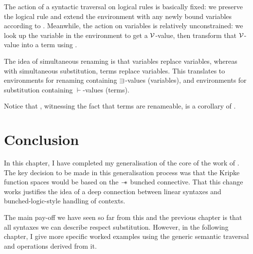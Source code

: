 The action of a syntactic traversal on logical rules is basically fixed: we
preserve the logical rule and extend the environment with any newly bound
variables according to .
Meanwhile, the action on variables is relatively unconstrained: we look up the
variable in the environment to get a $\mathcal V$-value, then transform that $\mathcal V$-value
into a term using .

The idea of simultaneous renaming is that variables replace variables, whereas
with simultaneous substitution, terms replace variables.
This translates to environments for renaming containing $\sqni$-values
(variables), and environments for substitution containing $\vdash$-values
(terms).



Notice that , witnessing the fact
that terms are renameable, is a corollary of .


\section{Conclusion}

In this chapter, I have completed my generalisation of the core of the work of
\citet{AACMM21}.
The key decision to be made in this generalisation process was that the Kripke
function spaces would be based on the $\mathrel{\mathord{-}\hspace{-0.75ex}*}$ bunched connective.
That this change works justifies the idea of a deep connection between linear
syntaxes and bunched-logic-style handling of contexts.

The main pay-off we have seen so far from this and the previous chapter is that
all syntaxes we can describe respect substitution.
However, in the following chapter, I give more specific worked examples using
the generic semantic traversal and operations derived from it.
